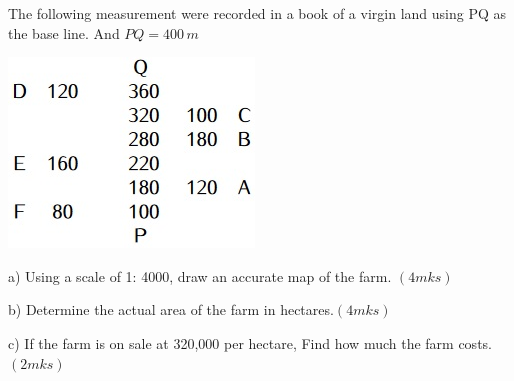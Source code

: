 \documentclass[
  a4paperpaper,
]{scrbook}
\begin{document}
\begin{tcolorbox}[enhanced jigsaw, left=2mm, colframe=quarto-callout-note-color-frame, toptitle=1mm, opacitybacktitle=0.6, rightrule=.15mm, colbacktitle=quarto-callout-note-color!10!white, colback=white, arc=.35mm, breakable, leftrule=.75mm, bottomtitle=1mm, bottomrule=.15mm, title=\textcolor{quarto-callout-note-color}{\faInfo}\hspace{0.5em}{Example 4}, titlerule=0mm, coltitle=black, toprule=.15mm, opacityback=0]

The following measurement were recorded in a book of a virgin land using
PQ as the base line. And \(PQ=400 \,m\)

\includegraphics{Images/CH18_E4.png}

a) Using a scale of 1: 4000, draw an accurate map of the farm.
\((4mks)\)

b) Determine the actual area of the farm in hectares.\((4mks)\)

c) If the farm is on sale at 320,000 per hectare, Find how much the farm
costs.\((2mks)\)

\end{tcolorbox}
\end{document}
